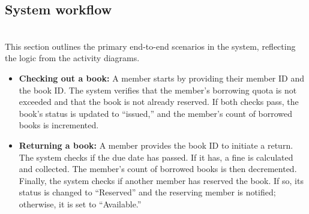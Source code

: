 \subsection{System workflow}\label{c8FhzkSfTii7jGoTZkcnH}
\\
This section outlines the primary end-to-end scenarios in the system, reflecting the logic from the activity diagrams.

\begin{itemize}
\item
\protect{}\label{jJkdUBWxySnjaEeGU6j9a}
\textbf{Checking out a book:} A member starts by providing their member ID and the book ID. The system verifies that the member's borrowing quota is not exceeded and that the book is not already reserved. If both checks pass, the book's status is updated to ``issued,'' and the member's count of borrowed books is incremented.
\item
\protect{}\label{ZncaIisDEs3uWKKm5pZV8}
\textbf{Returning a book:} A member provides the book ID to initiate a return. The system checks if the due date has passed. If it has, a fine is calculated and collected. The member's count of borrowed books is then decremented. Finally, the system checks if another member has reserved the book. If so, its status is changed to ``Reserved'' and the reserving member is notified; otherwise, it is set to ``Available.''
\end{itemize}

